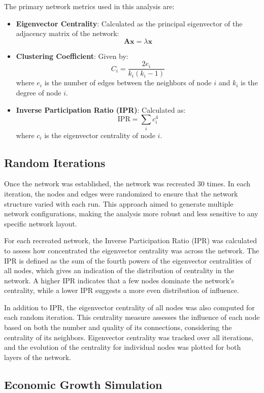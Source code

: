 \documentclass{article} %
\begin{document}
The primary network metrics used in this analysis are:
\begin{itemize}
  \item \textbf{Eigenvector Centrality}: Calculated as the principal eigenvector of the adjacency matrix of the network:
  \[
  \mathbf{Ax} = \lambda \mathbf{x}
  \]
  \item \textbf{Clustering Coefficient}: Given by:
  \[
  C_i = \frac{2e_i}{k_i(k_i - 1)}
  \]
  where \( e_i \) is the number of edges between the neighbors of node \(i\) and \( k_i \) is the degree of node \(i\).
  \item \textbf{Inverse Participation Ratio (IPR)}: Calculated as:
  \[
  \text{IPR} = \sum_i c_i^4
  \]
  where \( c_i \) is the eigenvector centrality of node \(i\).
\end{itemize}

\subsection{Random Iterations}
Once the network was established, the network was recreated 30 times. In each iteration, the nodes and edges were randomized to ensure that the network structure varied with each run. This approach aimed to generate multiple network configurations, making the analysis more robust and less sensitive to any specific network layout.

For each recreated network, the Inverse Participation Ratio (IPR) was calculated to assess how concentrated the eigenvector centrality was across the network. The IPR is defined as the sum of the fourth powers of the eigenvector centralities of all nodes, which gives an indication of the distribution of centrality in the network. A higher IPR indicates that a few nodes dominate the network's centrality, while a lower IPR suggests a more even distribution of influence.

In addition to IPR, the eigenvector centrality of all nodes was also computed for each random iteration. This centrality measure assesses the influence of each node based on both the number and quality of its connections, considering the centrality of its neighbors. Eigenvector centrality was tracked over all iterations, and the evolution of the centrality for individual nodes was plotted for both layers of the network.

\subsection{Economic Growth Simulation}
\end{document}
